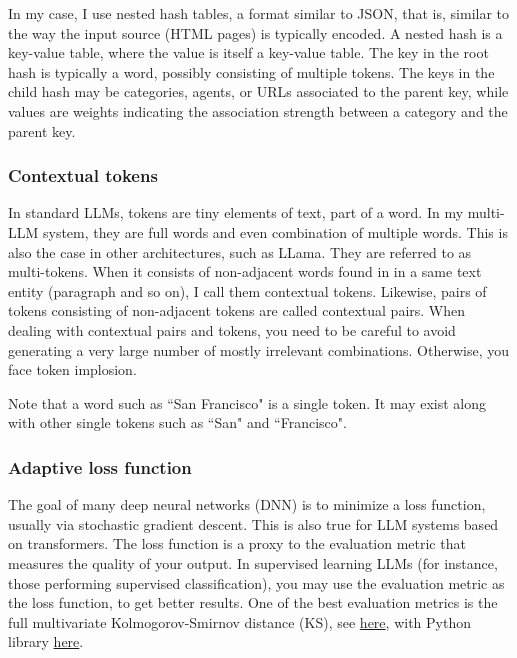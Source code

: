 \documentclass[10pt]{article}
\begin{document}
{In my case, I use \textcolor{index}{nested hash tables}, a format similar to 
\textcolor{index}{JSON}, that is, similar to the way the input source (HTML pages) is typically encoded. A nested hash is a key-value table, where the value is itself a key-value table. The key in the root hash is typically a word, possibly consisting of multiple tokens. The keys in the child hash may be categories, agents, or URLs associated to the parent key, while values are weights indicating the association strength between a category and the parent key.

\subsubsection{Contextual tokens}
In standard LLMs, tokens are tiny elements of text, part of a word. In my multi-LLM system, they are full words and even combination of multiple words. This is also the case in other architectures, such as \textcolor{index}{LLama}. They are referred to as multi-tokens. When it consists of non-adjacent words found in in a same text entity (paragraph and so on), I call them 
\textcolor{index}{contextual tokens}. Likewise, pairs of tokens consisting of non-adjacent tokens are called \textcolor{index}{contextual pairs}. When dealing with contextual pairs and tokens, you need to be careful to avoid generating a very large number of mostly irrelevant combinations. Otherwise, you face token implosion.

Note that a word such as ``San Francisco" is a single token. It may exist along with other single tokens such as ``San" and ``Francisco".

\subsubsection{Adaptive loss function}
The goal of many deep neural networks (\textcolor{index}{DNN}) is to minimize a loss function, usually via stochastic gradient descent. This is also true for LLM systems based on \textcolor{index}{transformers}. The loss function is a proxy to the evaluation metric that measures the quality of your output. In supervised learning LLMs (for instance, those performing supervised classification), you may use the evaluation metric as the loss function, to get better results. One of the best evaluation metrics is the full 
\textcolor{index}{multivariate Kolmogorov-Smirnov distance} (KS), see \href{https://mltblog.com/3WMKyLI}{here}, with Python library \href{https://pypi.org/project/genai-evaluation/}{here}.

}
\end{document}
